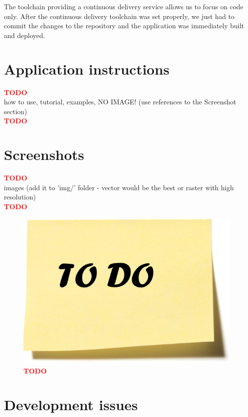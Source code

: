 \documentclass[11pt,a4paper]{article}
\newcommand{\TODO}{\textbf{\textcolor{red}{TODO}}} %
\begin{document}
The toolchain providing a continuous delivery service allows us to focus on code only. After the continuous delivery toolchain was set properly, we just had to commit the changes to the repository and the application was immediately built and deployed.

\section{Application instructions}

\begin{center}
    \TODO\\
    how to use, tutorial, examples, NO IMAGE! (use references to the Screenshot section)\\
    \TODO
\end{center}

\section{Screenshots}

\begin{center}
    \TODO\\
    images (add it to 'img/' folder - vector would be the best or raster with high resolution)\\
    \TODO
\end{center}

\begin{figure}[H]
    \centering
    \includegraphics[scale=0.3]{img/todo.png}
    \caption{\TODO}
\end{figure}

\section{Development issues}
\end{document}
